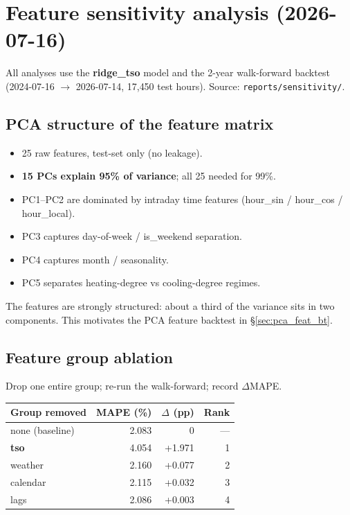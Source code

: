 \section{Feature sensitivity analysis (2026-07-16)}

All analyses use the \textbf{ridge\_tso} model and the 2-year walk-forward
backtest (2024-07-16 $\to$ 2026-07-14, 17{,}450 test hours).
Source: \texttt{reports/sensitivity/}.

\subsection{PCA structure of the feature matrix}

\begin{itemize}
  \item 25 raw features, test-set only (no leakage).
  \item \textbf{15 PCs explain 95\% of variance}; all 25 needed for 99\%.
  \item PC1--PC2 are dominated by intraday time features
        (hour\_sin / hour\_cos / hour\_local).
  \item PC3 captures day-of-week / is\_weekend separation.
  \item PC4 captures month / seasonality.
  \item PC5 separates heating-degree vs cooling-degree regimes.
\end{itemize}

The features are strongly structured: about a third of the variance sits in
two components. This motivates the PCA feature backtest in
\S\ref{sec:pca_feat_bt}.

\subsection{Feature group ablation}

Drop one entire group; re-run the walk-forward; record $\Delta$MAPE.

\begin{center}
\begin{tabular}{lrrr}
\toprule
Group removed & MAPE (\%) & $\Delta$ (pp) & Rank \\
\midrule
none (baseline)   & 2.083 &       0  & ---  \\
\textbf{tso}      & 4.054 & +1.971   & 1    \\
weather           & 2.160 & +0.077   & 2    \\
calendar          & 2.115 & +0.032   & 3    \\
lags              & 2.086 & +0.003   & 4    \\
\bottomrule
\end{tabular}
\end{center}


